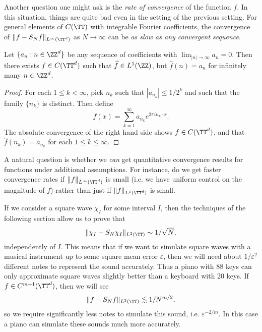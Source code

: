 Another question one might ask is the \emph{rate of convergence} of the function $f$. In this situation, things are quite bad even in the setting of the previous setting. For general elements of $C(\TT)$ with integrable Fourier coefficients, the convergence of $\| f - S_N f \|_{L^\infty(\TT^d)}$ as $N \to \infty$ can be \emph{as slow as any convergent sequence}.

\begin{theorem}
    Let $\{ a_n : n \in \ZZ^d \}$ be any sequence of coefficients with $\lim_{|n| \to \infty} a_n = 0$. Then there exists $f \in C(\TT^d)$ such that $\widehat{f} \in L^1(\ZZ)$, but $\widehat{f}(n) = a_n$ for infinitely many $n \in \ZZ^d$.
\end{theorem}
\begin{proof}
    For each $1 \leq k < \infty$, pick $n_k$ such that $|a_{n_k}| \leq 1/2^k$ and such that the family $\{ n_k \}$ is distinct. Then define
    \[ f(x) = \sum_{k = 1}^\infty a_{n_k} e^{2 \pi i n_k \cdot x}. \]
    The absolute convergence of the right hand side shows $f \in C(\TT^d)$, and that $\widehat{f}(n_k) = a_{n_k}$ for each $1 \leq k \leq \infty$.
\end{proof}

A natural question is whether we \emph{can} get quantitative convergence results for functions under additional assumptions. For instance, do we get faster convergence rates if $\| f \|_{L^\infty(\TT^d)}$ is small (i.e. we have uniform control on the magnitude of $f$) rather than just if $\| f \|_{L^1(\TT^d)}$ is small.

\begin{example}
    If we consider a square wave $\chi_I$ for some interval $I$, then the techniques of the following section allow us to prove that
    \[ \| \chi_I - S_N \chi_I \|_{L^2(\TT)} \sim 1/\sqrt{N}, \]
    independently of $I$. This means that if we want to simulate square waves with a musical instrument up to some square mean error $\varepsilon$, then we will need about $1/\varepsilon^2$ different notes to represent the sound accurately. Thus a piano with 88 keys can only approximate square waves slightly better than a keyboard with 20 keys. If $f \in C^{m+1}(\TT^d)$, then we will see
    \[ \| f - S_N f \|_{L^2(\TT)} \lesssim 1/N^{m/2}, \]
    so we require significantly less notes to simulate this sound, i.e. $\varepsilon^{-2/m}$. In this case a piano can simulate these sounds much more accurately.
\end{example}


